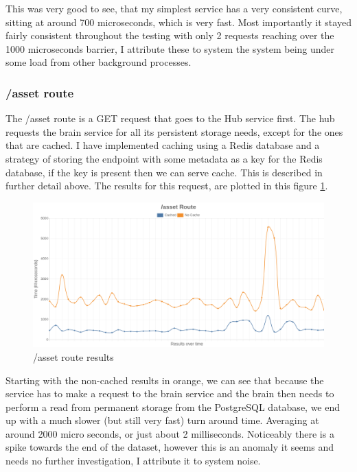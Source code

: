 \documentclass[titlepage]{article}
\begin{document}
This was very good to see, that my simplest service has a very consistent curve, sitting at around 700 microseconds, which is very fast. Most importantly it stayed fairly consistent throughout the testing with only 2 requests reaching over the 1000 microseconds barrier, I attribute these to system the system being under some load from other background processes.

\pagebreak
\subsubsection{/asset route}
The /asset route is a GET request that goes to the Hub service first. The hub requests the brain service for all its persistent storage needs, except for the ones that are cached. I have implemented caching using a Redis database and a strategy of storing the endpoint with some metadata as a key for the Redis database, if the key is present then we can serve cache. This is described in further detail above. The results for this request, are plotted in this figure \ref{asset-test}.

\begin{figure}[h!]
\includegraphics[width=\textwidth]{../results/asset.png}
  \caption{/asset route results}
  \label{asset-test}
\end{figure}

Starting with the non-cached results in orange, we can see that because the service has to make a request to the brain service and the brain then needs to perform a read from permanent storage from the PostgreSQL database, we end up with a much slower (but still very fast) turn around time. Averaging at around 2000 micro seconds, or just about 2 milliseconds. Noticeably there is a spike towards the end of the dataset, however this is an anomaly it seems and needs no further investigation, I attribute it to system noise. \\
\end{document}
